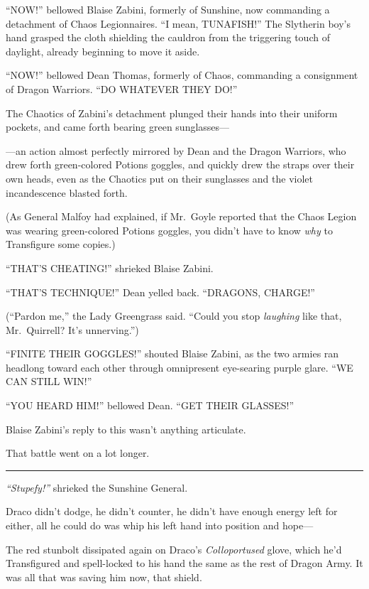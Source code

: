 ``NOW!'' bellowed Blaise Zabini, formerly of Sunshine, now commanding a
detachment of Chaos Legionnaires. ``I mean, TUNAFISH!'' The Slytherin
boy's hand grasped the cloth shielding the cauldron from the triggering
touch of daylight, already beginning to move it aside.

``NOW!'' bellowed Dean Thomas, formerly of Chaos, commanding a
consignment of Dragon Warriors. ``DO WHATEVER THEY DO!''

The Chaotics of Zabini's detachment plunged their hands into their
uniform pockets, and came forth bearing green sunglasses---

---an action almost perfectly mirrored by Dean and the Dragon Warriors,
who drew forth green-colored Potions goggles, and quickly drew the
straps over their own heads, even as the Chaotics put on their
sunglasses and the violet incandescence blasted forth.

(As General Malfoy had explained, if Mr.~Goyle reported that the Chaos
Legion was wearing green-colored Potions goggles, you didn't have to
know \emph{why} to Transfigure some copies.)

``THAT'S CHEATING!'' shrieked Blaise Zabini.

``THAT'S TECHNIQUE!'' Dean yelled back. ``DRAGONS, CHARGE!''

(``Pardon me,'' the Lady Greengrass said. ``Could you stop
\emph{laughing} like that, Mr.~Quirrell? It's unnerving.'')

``FINITE THEIR GOGGLES!'' shouted Blaise Zabini, as the two armies ran
headlong toward each other through omnipresent eye-searing purple glare.
``WE CAN STILL WIN!''

``YOU HEARD HIM!'' bellowed Dean. ``GET THEIR GLASSES!''

Blaise Zabini's reply to this wasn't anything articulate.

That battle went on a lot longer.

\begin{center}\rule{3in}{0.4pt}\end{center}

\emph{``Stupefy!''} shrieked the Sunshine General.

Draco didn't dodge, he didn't counter, he didn't have enough energy left
for either, all he could do was whip his left hand into position and
hope---

The red stunbolt dissipated again on Draco's \emph{Colloportused} glove,
which he'd Transfigured and spell-locked to his hand the same as the
rest of Dragon Army. It was all that was saving him now, that shield.


